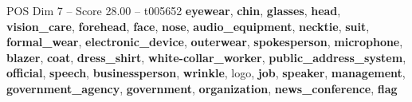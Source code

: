 \begin{textsample}{POS Dim 7 – Score 28.00 – t005652}  \label{ex:f7_pos_013}
\textbf{eyewear}, \textbf{chin}, \textbf{glasses}, \textbf{head}, \textbf{vision\_care}, \textbf{forehead}, \textbf{face}, \textbf{nose}, \textbf{audio\_equipment}, \textbf{necktie}, \textbf{suit}, \textbf{formal\_wear}, \textbf{electronic\_device}, \textbf{outerwear}, \textbf{spokesperson}, \textbf{microphone}, \textbf{blazer}, \textbf{coat}, \textbf{dress\_shirt}, \textbf{white-collar\_worker}, \textbf{public\_address\_system}, \textbf{official}, \textbf{speech}, \textbf{businessperson}, \textbf{wrinkle}, logo, \textbf{job}, \textbf{speaker}, \textbf{management}, \textbf{government\_agency}, \textbf{government}, \textbf{organization}, \textbf{news\_conference}, \textbf{flag}

\end{textsample}
